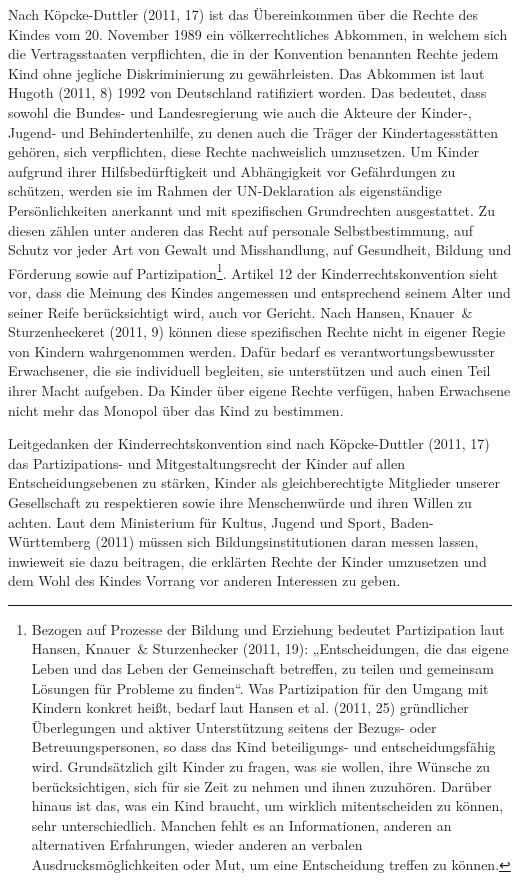 Nach Köpcke-Duttler (2011, 17) ist das Übereinkommen über die Rechte des Kindes vom 20. November 1989 ein völkerrechtliches Abkommen, in welchem sich die Vertragsstaaten verpflichten, die in der Konvention benannten Rechte jedem Kind ohne jegliche Diskriminierung zu gewährleisten. Das Abkommen ist laut Hugoth (2011, 8) 1992 von Deutschland ratifiziert worden. Das bedeutet, dass sowohl die Bundes- und Landesregierung wie auch die Akteure der Kinder-, Jugend- und Behindertenhilfe, zu denen auch die Träger der Kindertagesstätten gehören, sich verpflichten, diese Rechte nachweislich umzusetzen. Um Kinder aufgrund ihrer Hilfsbedürftigkeit und Abhängigkeit vor Gefährdungen zu schützen, werden sie im Rahmen der UN-Deklaration als eigenständige Persönlichkeiten anerkannt und mit spezifischen Grundrechten ausgestattet. Zu diesen zählen unter anderen das Recht auf personale Selbstbestimmung, auf Schutz vor jeder Art von Gewalt und Misshandlung, auf Gesundheit, Bildung und Förderung sowie auf Partizipation\footnote{Bezogen auf Prozesse der Bildung und Erziehung bedeutet Partizipation laut Hansen, Knauer~\& Sturzenhecker (2011, 19): „Entscheidungen, die das eigene Leben und das Leben der Gemeinschaft betreffen, zu teilen und gemeinsam Lösungen für Probleme zu finden“. Was Partizipation für den Umgang mit Kindern konkret heißt, bedarf laut Hansen et al. (2011, 25) gründlicher Überlegungen und aktiver Unterstützung seitens der Bezugs- oder Betreuungspersonen, so dass das Kind beteiligungs- und entscheidungsfähig wird. Grundsätzlich gilt Kinder zu fragen, was sie wollen, ihre Wünsche zu berücksichtigen, sich für sie Zeit zu nehmen und ihnen zuzuhören. Darüber hinaus ist das, was ein Kind braucht, um wirklich mitentscheiden zu können, sehr unterschiedlich. Manchen fehlt es an Informationen, anderen an alternativen Erfahrungen, wieder anderen an verbalen Ausdrucksmöglichkeiten oder Mut, um eine Entscheidung treffen zu können.}. 
Artikel 12 der Kinderrechtskonvention sieht vor, dass die Meinung des Kindes angemessen und entsprechend seinem Alter und seiner Reife berücksichtigt wird, auch vor Gericht. Nach Hansen, Knauer~\& Sturzenheckeret (2011, 9) können diese spezifischen Rechte nicht in eigener Regie von Kindern wahrgenommen werden. Dafür bedarf es verantwortungsbewusster Erwachsener, die sie individuell begleiten, sie unterstützen und auch einen Teil ihrer Macht aufgeben. Da Kinder über eigene Rechte verfügen, haben Erwachsene nicht mehr das Monopol über das Kind zu bestimmen. 

Leitgedanken der Kinderrechtskonvention sind nach Köpcke-Duttler (2011, 17) das Partizipations- und Mitgestaltungsrecht der Kinder auf allen Entscheidungsebenen zu stärken, Kinder als gleichberechtigte Mitglieder unserer Gesellschaft zu respektieren sowie ihre Menschenwürde und ihren Willen zu achten. Laut dem Ministerium für Kultus, Jugend und Sport, Baden-Württemberg (2011) müssen sich Bildungsinstitutionen daran messen lassen, inwieweit sie dazu beitragen, die erklärten Rechte der Kinder umzusetzen und dem Wohl des Kindes Vorrang vor anderen Interessen zu geben.


